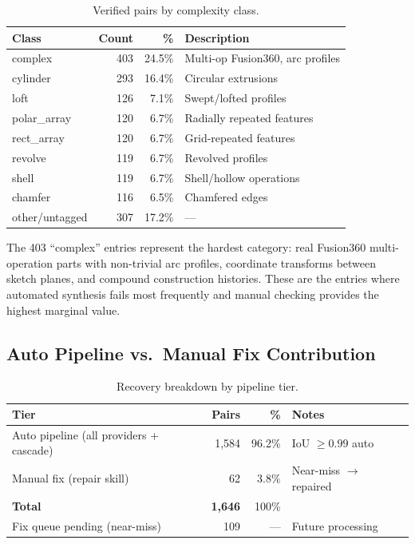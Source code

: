 \begin{table}[h]
\centering
\small
\caption{Verified pairs by complexity class.}
\label{tab:complexity}
\begin{tabular}{lrrl}
\toprule
\textbf{Class} & \textbf{Count} & \textbf{\%} & \textbf{Description} \\
\midrule
complex       & 403 & 24.5\% & Multi-op Fusion360, arc profiles \\
cylinder      & 293 & 16.4\% & Circular extrusions \\
loft          & 126 &  7.1\% & Swept/lofted profiles \\
polar\_array  & 120 &  6.7\% & Radially repeated features \\
rect\_array   & 120 &  6.7\% & Grid-repeated features \\
revolve       & 119 &  6.7\% & Revolved profiles \\
shell         & 119 &  6.7\% & Shell/hollow operations \\
chamfer       & 116 &  6.5\% & Chamfered edges \\
other/untagged & 307 & 17.2\% & --- \\
\bottomrule
\end{tabular}
\end{table}

The 403 ``complex'' entries represent the hardest category: real Fusion360 multi-operation parts with non-trivial arc profiles, coordinate transforms between sketch planes, and compound construction histories. These are the entries where automated synthesis fails most frequently and manual checking provides the highest marginal value.

\subsection{Auto Pipeline vs.\ Manual Fix Contribution}

\begin{table}[h]
\centering
\small
\caption{Recovery breakdown by pipeline tier.}
\label{tab:recovery}
\begin{tabular}{lrrl}
\toprule
\textbf{Tier} & \textbf{Pairs} & \textbf{\%} & \textbf{Notes} \\
\midrule
Auto pipeline (all providers + cascade) & 1,584 & 96.2\% & IoU $\geq 0.99$ auto \\
Manual fix (repair skill)               &    62 &  3.8\% & Near-miss $\to$ repaired \\
\textbf{Total} & \textbf{1,646} & 100\% & \\
Fix queue pending (near-miss) & 109 & --- & Future processing \\
\bottomrule
\end{tabular}
\end{table}


